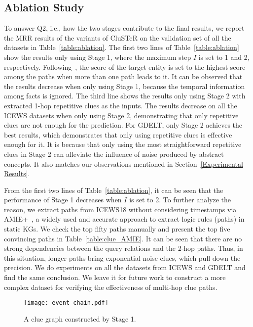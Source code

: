 \documentclass[11pt,a4paper]{article}
\begin{document}
\subsection{Ablation Study}
To answer Q2, i.e., how the two stages contribute to the final results,
we report the MRR results of the variants of CluSTeR on the validation set of
all the datasets in Table~\ref{table:ablation}. The first two lines of
Table~\ref{table:ablation} show the results only using Stage 1, where the
maximum step $I$ is set to 1 and 2, respectively.
Following~\citet{lin2018multi}, the score of the target entity is set to the
highest score among the paths when more than one path leads to it.  It can be
observed that the results decrease when only using Stage 1, because the temporal
information among facts is ignored. The third line shows the results only using
Stage 2 with extracted 1-hop repetitive clues as the inputs. The results decrease on
all the ICEWS datasets when only using Stage 2, demonstrating that only
repetitive clues are not enough for the prediction. For GDELT, only Stage 2
achieves the best results, which demonstrates that only using repetitive clues
is effective enough for it. It is because that only using the most
straightforward repetitive clues in Stage 2 can alleviate the influence of noise
produced by abstract concepts. It also matches our
observations mentioned in Section~\ref{Experimental Results}.

From the first two lines of Table~\ref{table:ablation}, it can be seen
that the performance of Stage 1 decreases when $I$ is set to 2. To further
analyze the reason, we extract paths from ICEWS18 without considering timestamps
via AMIE+~\cite{galarraga2015fast}, a widely used and accurate approach to
extract logic rules (paths) in static KGs. We check the top fifty paths manually and present the top five convincing paths in
Table~\ref{table:clue_AMIE}. It can be seen that there are no strong
dependencies between the query relations and the 2-hop paths. Thus, in this
situation, longer paths bring exponential noise clues, which pull down the
precision. We do experiments on all the datasets from ICEWS and GDELT and find
the same conclusion. We leave it for future work to construct a more complex
dataset for verifying the effectiveness of multi-hop clue paths.


\begin{figure}[tbp]
  \centering
  \texttt{[image: event-chain.pdf]}
  \caption{A clue graph constructed by Stage 1. }
  \label{fig:clue_graph}
  \end{figure}
\end{document}
